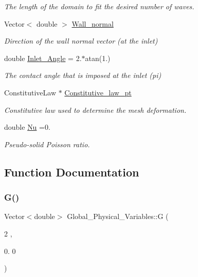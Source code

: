 \begin{DoxyCompactItemize}
\begin{DoxyCompactList}\small\item\em The length of the domain to fit the desired number of waves. \end{DoxyCompactList}\item 
Vector$<$ double $>$ \hyperlink{namespaceGlobal__Physical__Variables_a5feb3df21fc4a0adefadecb8a8ed98d7}{Wall\+\_\+normal}
\begin{DoxyCompactList}\small\item\em Direction of the wall normal vector (at the inlet) \end{DoxyCompactList}\item 
double \hyperlink{namespaceGlobal__Physical__Variables_a1c3587461447262715bd444ac91a29c9}{Inlet\+\_\+\+Angle} = 2.$\ast$atan(1.)
\begin{DoxyCompactList}\small\item\em The contact angle that is imposed at the inlet (pi) \end{DoxyCompactList}\item 
Constitutive\+Law $\ast$ \hyperlink{namespaceGlobal__Physical__Variables_a2a37fb040c832ee7a086bb13bb02a100}{Constitutive\+\_\+law\+\_\+pt}
\begin{DoxyCompactList}\small\item\em Constitutive law used to determine the mesh deformation. \end{DoxyCompactList}\item 
double \hyperlink{namespaceGlobal__Physical__Variables_a3962c36313826b19f216f6bbbdd6a477}{Nu} =0.
\begin{DoxyCompactList}\small\item\em Pseudo-\/solid Poisson ratio. \end{DoxyCompactList}\end{DoxyCompactItemize}


\subsection{Function Documentation}
\mbox{\label{namespaceGlobal__Physical__Variables_aa868968dead376240a69f9152bd599b9}} 
\subsubsection{\texorpdfstring{G()}{G()}}
{\footnotesize\ttfamily Vector$<$double$>$ Global\+\_\+\+Physical\+\_\+\+Variables\+::G (\begin{DoxyParamCaption}\item[{2}]{,  }\item[{0.}]{0 }\end{DoxyParamCaption})}



